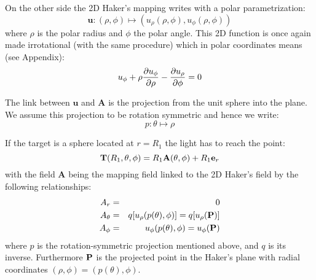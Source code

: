 %
%

On the other side the 2D Haker's mapping writes with a polar parametrization:
\[ \mathbf{u}: (\rho, \phi) \mapsto (u_\rho(\rho, \phi), u_\phi(\rho, \phi)) \]
where $\rho$ is the polar radius and $\phi$ the polar angle.
This 2D function is once again made irrotational (with the same procedure)
 which in polar coordinates means (see Appendix):
\[ u_\phi + \rho\frac{\partial{u_\phi}}{\partial{\rho}} - \frac{\partial{u_\rho}}{\partial{\phi}} = 0 \]

The link between $\mathbf{u}$ and $\mathbf{A}$ is the projection from the 
unit sphere into the plane. We assume this projection to be rotation symmetric and hence
we write:
\[ p :\theta  \mapsto \rho \]

If the target is a sphere located at $r=R_1$ the light has to reach the point:
\[ \mathbf{T}(R_1, \theta, \phi) = R_1 \mathbf{A}(\theta, \phi) + R_1\mathbf{e}_r \]
with the field $\mathbf{A}$ being the mapping field linked to the 2D Haker's field
by the following relationships:
\begin{eqnarray*}
A_r &=& 0  \\
A_\theta &=& q[u_\rho(p(\theta),  \phi)]  =  q[u_\rho(\mathbf{P})]  \\
A_\phi &=& u_\phi(p(\theta),  \phi)  = u_\phi(\mathbf{P})
\end{eqnarray*}
where $p$ is the rotation-symmetric 
projection mentioned above,
and $q$ is its inverse. Furthermore $\mathbf{P}$ is
the projected point in the Haker's plane with radial coordinates
$ (\rho, \phi) = (p(\theta), \phi)$.

